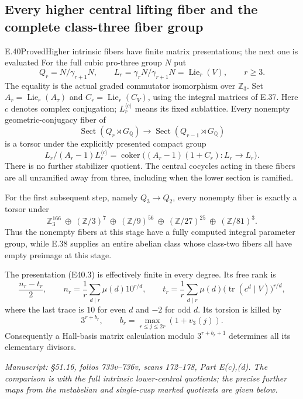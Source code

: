 \subsection{Every higher central lifting fiber and the complete class-three fiber group}

\begin{statement}{E.40}{Proved}{Higher intrinsic fibers have finite matrix presentations; the next one is evaluated}
For the full cubic pro-three group $N$ put
\[
 Q_r=N/\gamma_{r+1}N,\qquad
 L_r=\gamma_rN/\gamma_{r+1}N
       =\operatorname{Lie}_r(V),\qquad r\ge3.
 \tag{E40.1}
\]
The equality is the actual graded commutator isomorphism
over $\mathbb Z_3$. Set
$A_r=\operatorname{Lie}_r(A_\tau)$ and
$C_r=\operatorname{Lie}_r(C_V)$, using the integral
matrices of E.37. Here $c$ denotes complex conjugation;
$L_r^{\langle c\rangle}$ means its fixed sublattice.
Every nonempty geometric-conjugacy fiber of
\[
 \operatorname{Sect}(Q_r\rtimes G_{\mathbb Q})
      \longrightarrow
 \operatorname{Sect}(Q_{r-1}\rtimes G_{\mathbb Q})
 \tag{E40.2}
\]
is a torsor under the explicitly presented compact group
\[
 L_r/(A_r-1)L_r^{\langle c\rangle}
       =\operatorname{coker}\bigl((A_r-1)(1+C_r):L_r\to L_r\bigr).
 \tag{E40.3}
\]
There is no further stabilizer quotient. The central
cocycles acting in these fibers are all unramified away
from three, including when the lower section is ramified.

For the first subsequent step, namely $Q_3\to Q_2$,
every nonempty fiber is exactly a torsor under
\[
 \mathbb Z_3^{166}\ \oplus\
 (\mathbb Z/3)^7\ \oplus\
 (\mathbb Z/9)^{56}\ \oplus\
 (\mathbb Z/27)^{25}\ \oplus\
 (\mathbb Z/81)^3.
 \tag{E40.4}
\]
Thus the nonempty fibers at this stage have a fully
computed integral parameter group, while E.38 supplies
an entire abelian class whose class-two fibers all have
empty preimage at this stage.

The presentation (E40.3) is effectively finite in every
degree. Its free rank is
\[
 \frac{n_r-t_r}{2},\qquad
 n_r=\frac1r\sum_{d\mid r}\mu(d)10^{r/d},\qquad
 t_r=\frac1r\sum_{d\mid r}\mu(d)
       \bigl(\operatorname{tr}(c^d\mid V)\bigr)^{r/d},
 \tag{E40.5}
\]
where the last trace is $10$ for even $d$ and $-2$
for odd $d$. Its torsion is killed by
\[
 3^{r+b_r},\qquad
 b_r=\max_{r\le j\le2r}(1+v_3(j)).
 \tag{E40.6}
\]
Consequently a Hall-basis matrix calculation modulo
$3^{r+b_r+1}$ determines all its elementary divisors.

\emph{Manuscript: \S51.16, folios 733v--736v, scans 172--178,
Part E(c),(d). The comparison is with the full intrinsic
lower-central quotients; the precise further maps from
the metabelian and single-cusp marked quotients are
given below.}
\end{statement}
